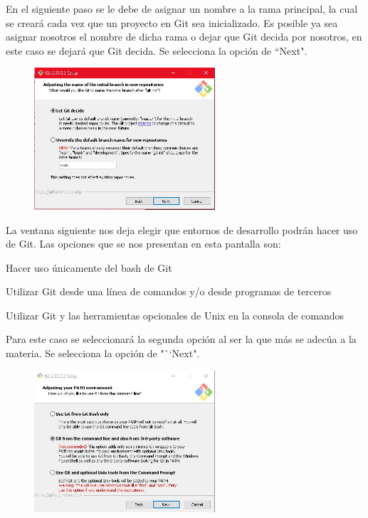 \documentclass[10pt,a4paper]{article} %
\begin{document}
\begin{enumerate}
{			\pagebreak
			\item En el siguiente paso se le debe de asignar un nombre a la rama principal, la cual se crear{\' a} cada vez que un proyecto en Git sea inicializado. Es posible ya sea asignar nosotros el nombre de dicha rama o dejar que Git decida por nosotros, en este caso se dejar{\' a} que Git decida. Se selecciona la opci{\' o}n de ``Next".
			\begin{figure}[H]
				\includegraphics[width=0.6\textwidth]{9.jpg}
				\centering
				\label{img:paso9}
			\end{figure}
			\item La ventana siguiente nos deja elegir que entornos de desarrollo podr{\' a}n hacer uso de Git. Las opciones que se nos presentan en esta pantalla son:
			\begin{itemize}
				{
					\item Hacer uso {\' u}nicamente del bash de Git
					\item Utilizar Git desde una l{\' i}nea de comandos y/o desde programas de terceros
					\item Utilizar Git y las herramientas opcionales de Unix en la consola de comandos
				}
			\end{itemize}
			Para este caso se seleccionar{\' a} la segunda opci{\' o}n al ser la que m{\' a}s se adec{\' u}a a la materia. Se selecciona la opci{\' o}n de "``Next".
			\begin{figure}[H]
				\includegraphics[width=0.6\textwidth]{10.jpg}
				\centering
				\label{img:paso10}
			\end{figure}
			
}
\end{enumerate}
\end{document}
